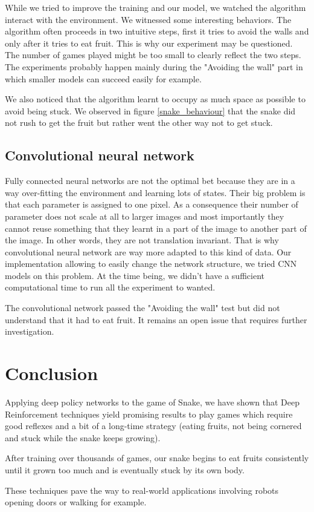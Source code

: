 \documentclass{article}
\begin{document}
While we tried to improve the training and our model, we watched the algorithm interact with the environment.
We witnessed some interesting behaviors.
The algorithm often proceeds in two intuitive steps, first it tries to avoid the walls and only after it tries to eat fruit.
This is why our experiment may be questioned. The number of games played might be too small to clearly reflect the two steps. The experiments probably happen mainly during the "Avoiding the wall" part in which smaller models can succeed easily for example.

We also noticed that the algorithm learnt to occupy as much space as possible to avoid being stuck. We observed in figure \ref{snake_behaviour} that the snake did not rush to get the fruit but rather went the other way not to get stuck.

\subsection{Convolutional neural network}

Fully connected neural networks are not the optimal bet because they are in a way over-fitting the environment and learning lots of states.
Their big problem is that each parameter is assigned to one pixel.
As a consequence their number of parameter does not scale at all to larger images and most importantly they cannot reuse something that they learnt in a part of the image to another part of the image.
In other words, they are not translation invariant.
That is why convolutional neural network are way more adapted to this kind of data.
Our implementation allowing to easily change the network structure, we tried CNN models on this problem.
At the time being, we didn't have a sufficient computational time to run all the experiment to wanted.

The convolutional network passed the "Avoiding the wall" test but did not understand that it had to eat fruit.
It remains an open issue that requires further investigation.

\section{Conclusion}

Applying deep policy networks to the game of Snake, we have shown that Deep Reinforcement techniques yield promising results to play games which require good reflexes and a bit of a long-time strategy (eating fruits, not being cornered and stuck while the snake keeps growing).

After training over thousands of games, our snake begins to eat fruits consistently until it grown too much and is eventually stuck by its own body.

These techniques pave the way to real-world applications involving robots opening doors or walking for example.

\newpage



\end{document}
